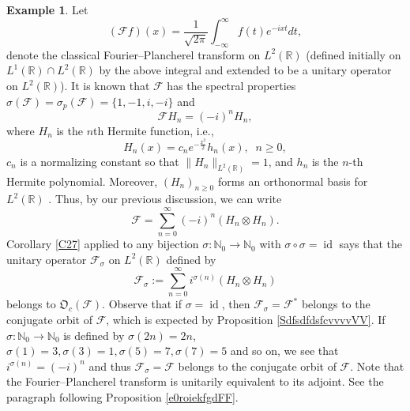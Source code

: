 \documentclass{dis}
\theoremstyle{plain}
\theoremstyle{definition}
\newtheorem{Example}[equation]{Example}
\def\R{\mathbb{R}}
\def\N{\mathbb{N}}
\renewcommand{\geq}{\geqslant}
\newcommand{\0}{{\color{lightgray}0}}
\begin{document}
\begin{Example}\label{nknjdhfkhfghHJHJHJ}
Let
\begin{equation}\label{FTFTFT}
 (\mathcal{F}f)(x) = \frac{1}{\sqrt{2 \pi}} \int_{-\infty}^{\infty} f(t) e^{-ixt} dt,
 \end{equation}
  denote the classical Fourier--Plancherel transform on $L^2(\R)$ (defined initially on $L^1(\R) \cap L^2(\R)$ by the above integral and extended to be a unitary operator on $L^2(\R)$). 
  It is known that $\mathcal{F}$ has the spectral properties  $\sigma(\mathcal{F}) = \sigma_{p}(\mathcal{F}) = \{1, -1, i, -i\}$ and 
  \begin{equation}\label{Fteigenv-aces}
 \mathcal{F} H_n = (-i)^n H_n,
 \end{equation}
where $H_n$ is the $n$th Hermite function, i.e., $$H_{n}(x) = c_n e^{-\frac{x^2}{2}} h_{n}(x), \; \; n \geq 0,$$
$c_n$ is a normalizing constant so that $\|H_n\|_{L^2(\R)}= 1$, and $h_n$ is the $n$-th Hermite polynomial.
 Moreover, $(H_{n})_{n \geq 0}$ forms an orthonormal basis for $L^2(\R)$ \cite[Ch.11]{MR4545809}.
 Thus, by our previous discussion, we can write
 \begin{equation}\label{diagonalizeFFF}
 \mathcal{F} = \sum_{n = 0}^{\infty} (-i)^n (H_{n} \otimes H_n).
 \end{equation}
Corollary \ref{C27} applied to any bijection $\sigma: \N_0 \to \N_0$ with $\sigma \circ \sigma = \operatorname{id}$ says that the  unitary operator $\mathcal{F}_{\sigma}$ on $L^2(\R)$ defined by
 $$\mathcal{F}_{\sigma}  := \sum_{n = 0}^{\infty} i^{\sigma(n)} (H_{n}\otimes H_{n})$$ belongs to $\mathfrak{O}_c(\mathcal{F})$. Observe that if $\sigma = \operatorname{id}$, then $\mathcal{F}_{\sigma} = \mathcal{F}^{*}$ belongs to the conjugate orbit of $\mathcal{F}$, which is expected by Proposition \ref{SdfsdfdsfcvvvvVV}. If $\sigma: \N_0 \to \N_0$ is defined by $\sigma(2n) = 2n$, $\sigma(1) = 3, \sigma(3) = 1, \sigma(5) = 7, \sigma(7) = 5$ and so on, we see that $i^{\sigma(n)} = (-i)^n$ and thus $\mathcal{F}_{\sigma} = \mathcal{F}$ belongs to the conjugate orbit of $\mathcal{F}$. Note that the Fourier--Plancherel transform is unitarily equivalent to its adjoint. See the paragraph following Proposition \ref{e0roiekfgdFF}.
\end{Example}
\end{document}

